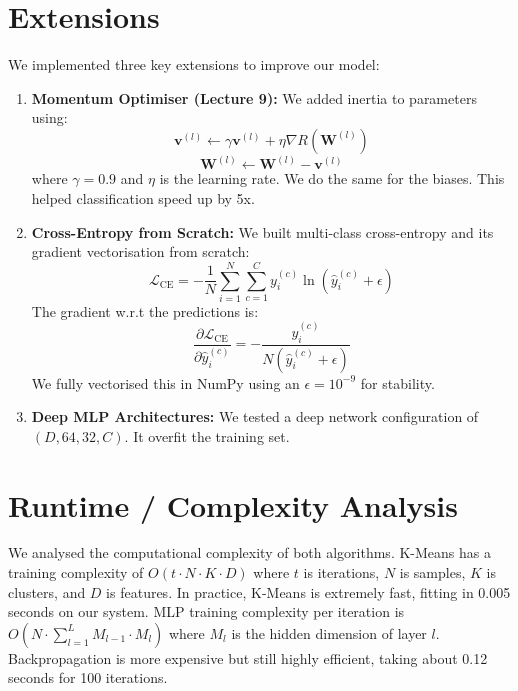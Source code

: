 \documentclass[10pt, twocolumn]{article}
\begin{document}
\section{Extensions}
We implemented three key extensions to improve our model:
\begin{enumerate}
    \setlength{\itemsep}{0pt}
    \setlength{\parskip}{0pt}
    \item \textbf{Momentum Optimiser (Lecture 9):} We added inertia to parameters using:
    \begin{equation}
        \mathbf{v}^{(l)} \leftarrow \gamma \mathbf{v}^{(l)} + \eta \nabla R(\mathbf{W}^{(l)})
    \end{equation}
    \begin{equation}
        \mathbf{W}^{(l)} \leftarrow \mathbf{W}^{(l)} - \mathbf{v}^{(l)}
    \end{equation}
    where $\gamma = 0.9$ and $\eta$ is the learning rate. We do the same for the biases. This helped classification speed up by 5x.
    \item \textbf{Cross-Entropy from Scratch:} We built multi-class cross-entropy and its gradient vectorisation from scratch:
    \begin{equation}
        \mathcal{L}_{\text{CE}} = -\frac{1}{N} \sum_{i=1}^N \sum_{c=1}^C y_{i}^{(c)} \ln(\hat{y}_{i}^{(c)} + \epsilon)
    \end{equation}
    The gradient w.r.t the predictions is:
    \begin{equation}
        \frac{\partial \mathcal{L}_{\text{CE}}}{\partial \hat{y}_{i}^{(c)}} = -\frac{y_{i}^{(c)}}{N(\hat{y}_{i}^{(c)} + \epsilon)}
    \end{equation}
    We fully vectorised this in NumPy using an $\epsilon = 10^{-9}$ for stability.
    \item \textbf{Deep MLP Architectures:} We tested a deep network configuration of $(D, 64, 32, C)$. It overfit the training set.
\end{enumerate}

\section{Runtime / Complexity Analysis}
We analysed the computational complexity of both algorithms. K-Means has a training complexity of $O(t \cdot N \cdot K \cdot D)$ where $t$ is iterations, $N$ is samples, $K$ is clusters, and $D$ is features. In practice, K-Means is extremely fast, fitting in 0.005 seconds on our system. MLP training complexity per iteration is $O(N \cdot \sum_{l=1}^L M_{l-1} \cdot M_l)$ where $M_l$ is the hidden dimension of layer $l$. Backpropagation is more expensive but still highly efficient, taking about 0.12 seconds for 100 iterations.
\end{document}
